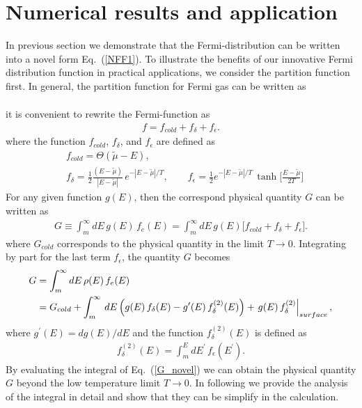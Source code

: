 \documentclass[sn-mathphys,Numbered]{sn-jnl}
\theoremstyle{thmstyleone}%
\theoremstyle{thmstyletwo}%
\theoremstyle{thmstylethree}%
\begin{document}

\section{Numerical results and application}\label{NumericalResult}
In previous section we demonstrate that the Fermi-distribution can be written into a novel form Eq.~(\ref{NFF1}). To illustrate the benefits of our innovative Fermi distribution function in practical applications, we consider the partition function first. In general, the partition function for Fermi gas can be written as\cite{}
\begin{align}
\end{align}


it is convenient to rewrite the Fermi-function as 
\begin{align}
f=f_{cold} +f_\delta+f_\epsilon.
\end{align}
where the function $f_{cold}$, $f_{\delta}$, and $f_{\epsilon}$ are defined as
\begin{align}
&f_{cold}=\Theta(\tilde\mu-E),\\
&f_{\delta}=\frac{1}{2}\frac{(E-\tilde\mu)}{|E-\tilde\mu|}\,e^{-|E-\tilde\mu|/T},\qquad f_{\epsilon}=\frac{1}{2}e^{-|E-\tilde\mu|/T}\,\tanh\bigg[\frac{E-\tilde\mu}{2T}\bigg]
\end{align}
For any given function $g(E)$, then the correspond physical quantity $G$ can be written as
\begin{align}
G\equiv\int^{\infty}_{m}dE\,g(E)\,f_e(E)=\int^{\infty}_{m}dE\,g(E)\bigg[f_{cold} +f_\delta+f_\epsilon\bigg].
\end{align}
where $G_{cold}$ corresponds to the physical quantity in the limit $T\to 0$. Integrating by part for the last term $f_\epsilon$, the quantity $G$ becomes
\begin{align}
\label{G_novel}
G&=\int^{\infty}_{m}dE\,\rho(E)\,f_e(E)\notag\\
&=G_{cold}+\int^{\infty}_{m}\,dE\left(g(E)\,f_\delta(E)-g^\prime(E)\,f^{(2)}_\delta(E)\right)+\left.g(E)\,f^{(2)}_\delta\right|_{surface},
\end{align}
where $g^\prime(E)=dg(E)/dE$ and the function $f^{(2)}_\delta(E)$ is defined as
\begin{align}
f^{(2)}_\delta(E)=\int^E_{m}dE^\prime\,f_\epsilon(E^\prime).
\end{align}
By evaluating the integral of Eq.~(\ref{G_novel}) we can obtain  the physical quantity $G$ beyond the low temperature limit $T\to 0$. In following we provide the analysis of the integral in detail and show that they can be simplify in the calculation.
\end{document}
